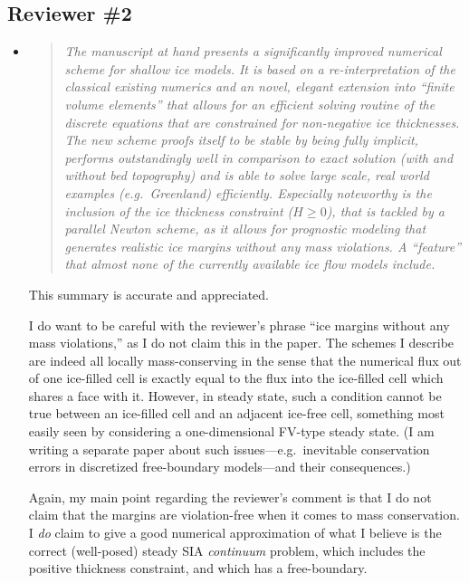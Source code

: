 \documentclass[11pt,reqno]{amsart}
\newcommand{\reply}[2]{
\medskip\medskip
\item  \begin{quote}
\emph{#1}
\end{quote}

\medskip
\noindent #2}
\begin{document}
\subsection*{Reviewer \#2}  \begin{itemize}
\reply{The manuscript at hand presents a significantly improved numerical scheme for shallow ice models. It is based on a re-interpretation of the classical existing numerics and an novel, elegant extension into ``finite volume elements'' that allows for an efficient solving routine of the discrete equations that are constrained for non-negative ice thicknesses. The new scheme proofs itself to be stable by being fully implicit, performs outstandingly well in comparison to exact solution (with and without bed topography) and is able to solve large scale, real world examples (e.g.~Greenland) efficiently. Especially noteworthy is the inclusion of the ice thickness constraint ($H\ge 0$), that is tackled by a parallel Newton scheme, as it allows for prognostic modeling that generates realistic ice margins without any mass violations.  A ``feature'' that almost none of the currently available ice flow models include.}
{This summary is accurate and appreciated.

I do want to be careful with the reviewer's phrase ``ice margins without any mass violations,'' as I do not claim this in the paper.  The schemes I describe are indeed all locally mass-conserving in the sense that the numerical flux out of one ice-filled cell is exactly equal to the flux into the ice-filled cell which shares a face with it.  However, in steady state, such a condition cannot be true between an ice-filled cell and an adjacent ice-free cell, something most easily seen by considering a one-dimensional FV-type steady state.  (I am writing a separate paper about such issues---e.g.~inevitable conservation errors in discretized free-boundary models---and their consequences.)

Again, my main point regarding the reviewer's comment is that I do not claim that the margins are violation-free when it comes to mass conservation.  I \emph{do} claim to give a good numerical approximation of what I believe is the correct (well-posed) steady SIA \emph{continuum} problem, which includes the positive thickness constraint, and which has a free-boundary.}


\end{itemize}
\end{document}
